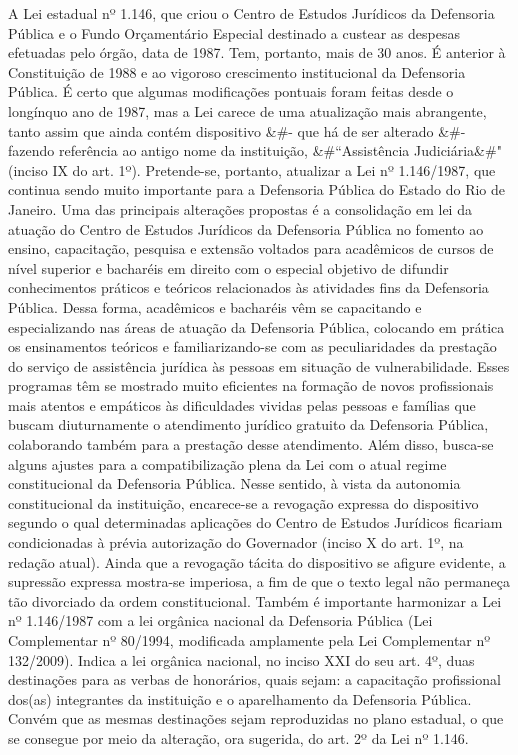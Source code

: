 \documentclass[10pt]{article}
\begin{document}
	A Lei estadual nº 1.146, que criou o Centro de Estudos Jurídicos da Defensoria Pública e o Fundo Orçamentário Especial destinado a custear as despesas efetuadas pelo órgão, data de 1987. Tem, portanto, mais de 30 anos. É anterior à Constituição de 1988 e ao vigoroso crescimento institucional da Defensoria Pública. É certo que algumas modificações pontuais foram feitas desde o longínquo ano de 1987, mas a Lei carece de uma atualização mais abrangente, tanto assim que ainda contém dispositivo &#- que há de ser alterado &#- fazendo referência ao antigo nome da instituição, &#``Assistência Judiciária&#" (inciso IX do art. 1º).
	Pretende-se, portanto, atualizar a Lei nº 1.146/1987, que continua sendo muito importante para a Defensoria Pública do Estado do Rio de Janeiro.
Uma das principais alterações propostas é a consolidação em lei da atuação do Centro de Estudos Jurídicos da Defensoria Pública no fomento ao ensino, capacitação, pesquisa e extensão voltados para acadêmicos de cursos de nível superior e bacharéis em direito com o especial objetivo de difundir conhecimentos práticos e teóricos relacionados às atividades fins da Defensoria Pública. 
	Dessa forma, acadêmicos e bacharéis vêm se capacitando e especializando nas áreas de atuação da Defensoria Pública, colocando em prática os ensinamentos teóricos e familiarizando-se com as peculiaridades da prestação do serviço de assistência jurídica às pessoas em situação de vulnerabilidade.
	Esses programas têm se mostrado muito eficientes na formação de novos profissionais mais atentos e empáticos às dificuldades vividas pelas pessoas e famílias que buscam diuturnamente o atendimento jurídico gratuito da Defensoria Pública, colaborando também para a prestação desse atendimento.
	Além disso, busca-se alguns ajustes para a compatibilização plena da Lei com o atual regime constitucional da Defensoria Pública. Nesse sentido, à vista da autonomia constitucional da instituição, encarece-se a revogação expressa do dispositivo segundo o qual determinadas aplicações do Centro de Estudos Jurídicos ficariam condicionadas à prévia autorização do Governador (inciso X do art. 1º, na redação atual). Ainda que a revogação tácita do dispositivo se afigure evidente, a supressão expressa mostra-se imperiosa, a fim de que o texto legal não permaneça tão divorciado da ordem constitucional.
	Também é importante harmonizar a Lei nº 1.146/1987 com a lei orgânica nacional da Defensoria Pública (Lei Complementar nº 80/1994, modificada amplamente pela Lei Complementar nº 132/2009). Indica a lei orgânica nacional, no inciso XXI do seu art. 4º, duas destinações para as verbas de honorários, quais sejam: a capacitação profissional dos(as) integrantes da instituição e o aparelhamento da Defensoria Pública. Convém que as mesmas destinações sejam reproduzidas no plano estadual, o que se consegue por meio da alteração, ora sugerida, do art. 2º da Lei nº 1.146.
\end{document}
